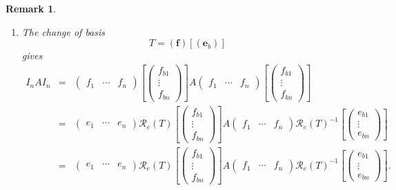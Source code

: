 \documentclass[aps,preprint]{revtex4}
\newtheorem{remark}[theorem]{Remark}
\begin{document}
\begin{remark}
\begin{enumerate}
\begin{enumerate}
\item The change of basis 
\begin{equation}
T=\left( \boldsymbol{f}\right) \left[ \left( \boldsymbol{e}_{b}\right) %
\right]
\end{equation}%
gives 
\begin{eqnarray}
I_{n}AI_{n} &=&\left( 
\begin{array}{ccc}
f_{1} & \cdots & f_{n}%
\end{array}%
\right) \left[ \left( 
\begin{array}{c}
f_{b1} \\ 
\vdots \\ 
f_{bn}%
\end{array}%
\right) \right] A\left( 
\begin{array}{ccc}
f_{1} & \cdots & f_{n}%
\end{array}%
\right) \left[ \left( 
\begin{array}{c}
f_{b1} \\ 
\vdots \\ 
f_{bn}%
\end{array}%
\right) \right] \\
&=&\left( 
\begin{array}{ccc}
e_{1} & \cdots & e_{n}%
\end{array}%
\right) \mathcal{R}_{e}\left( T\right) \left[ \left( 
\begin{array}{c}
f_{b1} \\ 
\vdots \\ 
f_{bn}%
\end{array}%
\right) \right] A\left( 
\begin{array}{ccc}
f_{1} & \cdots & f_{n}%
\end{array}%
\right) \mathcal{R}_{e}\left( T\right) ^{-1}\left[ \left( 
\begin{array}{c}
e_{b1} \\ 
\vdots \\ 
e_{bn}%
\end{array}%
\right) \right] \\
&=&\left( 
\begin{array}{ccc}
e_{1} & \cdots & e_{n}%
\end{array}%
\right) \mathcal{R}_{e}\left( T\right) \left[ \left( 
\begin{array}{c}
f_{b1} \\ 
\vdots \\ 
f_{bn}%
\end{array}%
\right) \right] A\left( 
\begin{array}{ccc}
f_{1} & \cdots & f_{n}%
\end{array}%
\right) \mathcal{R}_{e}\left( T\right) ^{-1}\left[ \left( 
\begin{array}{c}
e_{b1} \\ 
\vdots \\ 
e_{bn}%
\end{array}%
\right) \right] .
\end{eqnarray}


\end{enumerate}
\end{enumerate}
\end{remark}
\end{document}
